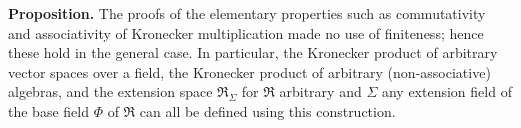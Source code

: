 \textbf{Proposition.} The proofs of the elementary properties such as commutativity and associativity of Kronecker multiplication made no use of finiteness; hence these hold in the general case. In particular, the Kronecker product of arbitrary vector spaces over a field, the Kronecker product of arbitrary (non-associative) algebras, and the extension space $\mathfrak{R}_\Sigma$ for $\mathfrak{R}$ arbitrary and $\Sigma$ any extension field of the base field $\Phi$ of $\mathfrak{R}$ can all be defined using this construction.
